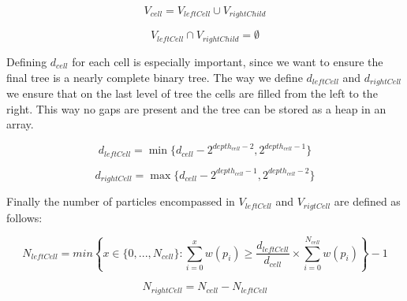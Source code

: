\documentclass[]{article}
\begin{document}
\begin{center}
	\begin{equation}\label{eq:v}
		V_{cell} = V_{leftCell} \cup V_{rightChild}
	\end{equation}
\end{center}

\begin{center}
	\begin{equation}\label{eq:v2}
		V_{leftCell} \cap V_{rightChild} = \emptyset
	\end{equation}
\end{center}

Defining $d_{cell}$ for each cell is especially important, since we want to ensure the final tree is a nearly complete binary tree. The way we define $d_{leftCell}$ and $d_{rightCell}$ we ensure that on the last level of tree the cells are filled from the left to the right. This way no gaps are present and the tree can be stored as a heap in an array. 

\begin{center}
	\begin{equation} \label{eq:d1}
		d_{leftCell} = \min \{ d_{cell} - 2^{depth_{cell} -2}, 2^{depth_{cell} - 1}\}
	\end{equation}
\end{center}

\begin{center}
	\begin{equation}  \label{eq:d2}
		d_{rightCell} = \max \{ d_{cell} - 2^{depth_{cell} -1}, 2^{depth_{cell} - 2}\}
	\end{equation}
\end{center}

Finally the number of particles encompassed in $V_{leftCell}$ and $V_{rigtCell}$ are defined as follows:

\begin{center}
	\begin{equation}\label{eq:N1}
		N_{leftCell} = min \left \{ x \in \{0,...,N_{cell} \} : \sum_{i=0}^{x} w(p_i) \geq \frac{d_{leftCell}}{d_{cell}} \times \sum_{i=0}^{N_{cell}} w(p_i) \right \} - 1
	\end{equation}
\end{center}

\begin{center}
	\begin{equation}\label{eq:N2}
		N_{rightCell} = N_{cell} - N_{leftCell}
	\end{equation}
\end{center}
\end{document}
